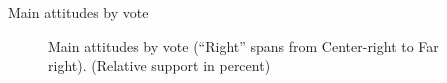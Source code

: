\documentclass[aspectratio=169,xcolor=dvipsnames, 11pt,mathserif]{beamer}
\begin{document}
\begin{framefont}{\small}
\begin{frame}{Main attitudes by vote \hyperlink{gcs_support}{}\label{gcs_vote}}
    \begin{figure}[h!] 
        \caption{Main attitudes by vote (``Right'' spans from Center-right to Far right). (Relative support in percent)}\label{fig:main_by_vote}
    \end{figure}
\end{frame}


\end{framefont}
\end{document}
